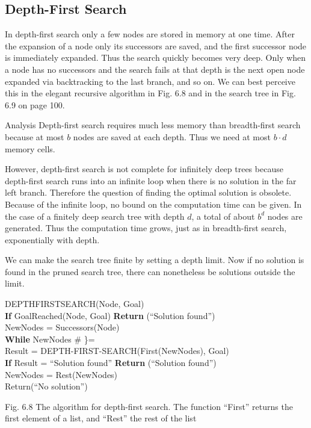 \documentclass[10pt]{book}
\begin{document}
\subsection{Depth-First Search}
In depth-first search only a few nodes are stored in memory at one time. After the expansion of a node only its successors are saved, and the first successor node is immediately expanded. Thus the search quickly becomes very deep. Only when a node has no successors and the search fails at that depth is the next open node expanded via backtracking to the last branch, and so on. We can best perceive this in the elegant recursive algorithm in Fig. 6.8 and in the search tree in Fig. 6.9 on page 100.

Analysis Depth-first search requires much less memory than breadth-first search because at most $b$ nodes are saved at each depth. Thus we need at most $b \cdot d$ memory cells.

However, depth-first search is not complete for infinitely deep trees because depth-first search runs into an infinite loop when there is no solution in the far left branch. Therefore the question of finding the optimal solution is obsolete. Because of the infinite loop, no bound on the computation time can be given. In the case of a finitely deep search tree with depth $d$, a total of about $b^{d}$ nodes are generated. Thus the computation time grows, just as in breadth-first search, exponentially with depth.

We can make the search tree finite by setting a depth limit. Now if no solution is found in the pruned search tree, there can nonetheless be solutions outside the limit.

\noindent DEPTHFIRSTSEARCH(Node, Goal)\\
\textbf{If} GoalReached(Node, Goal) \textbf{Return} (``Solution found'')\\
NewNodes = Successors(Node)\\
\textbf{While} NewNodes \# \}=\\
\hspace*{1.5em}Result = DEPTH-FIRST-SEARCH(First(NewNodes), Goal)\\
\hspace*{1.5em}\textbf{If} Result = ``Solution found'' \textbf{Return} (``Solution found'')\\
\hspace*{1.5em}NewNodes = Rest(NewNodes)\\
Return(``No solution'')

Fig. 6.8 The algorithm for depth-first search. The function ``First'' returns the first element of a list, and ``Rest'' the rest of the list
\end{document}
